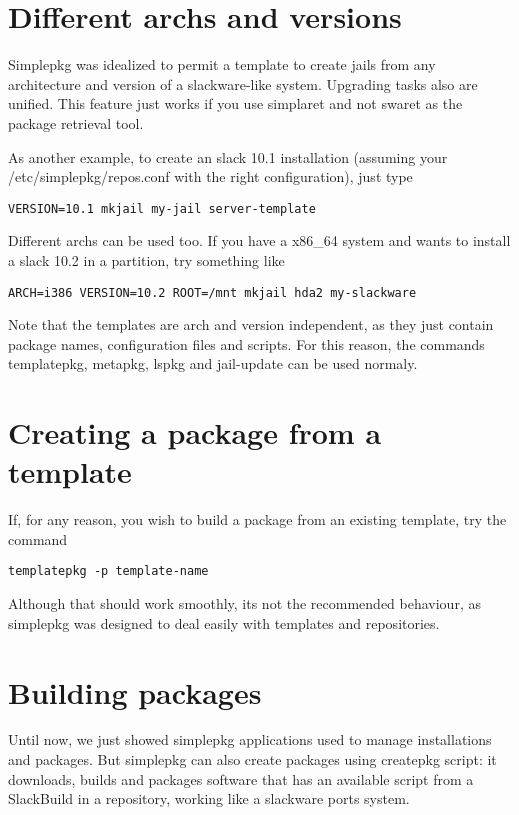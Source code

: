 \documentclass{article}
\begin{document}
\section{Different archs and versions}

Simplepkg was idealized to permit a template to create jails from any architecture and version of a slackware-like system. Upgrading tasks also are unified. This feature just works if you use simplaret and not swaret as the package retrieval tool.

As another example, to create an slack 10.1 installation (assuming your /etc/simplepkg/repos.conf with the right configuration), just type

\begin{verbatim}
VERSION=10.1 mkjail my-jail server-template 
\end{verbatim}

Different archs can be used too. If you have a x86\_64 system and wants to install a slack 10.2 in a partition, try something like

\begin{verbatim}
ARCH=i386 VERSION=10.2 ROOT=/mnt mkjail hda2 my-slackware
\end{verbatim}

Note that the templates are arch and version independent, as they just contain package names, configuration files and scripts. For this reason, the commands templatepkg, metapkg, lspkg and jail-update can be used normaly.

\section{Creating a package from a template}

If, for any reason, you wish to build a package from an existing template, try the command

\begin{verbatim}
templatepkg -p template-name
\end{verbatim}

Although that should work smoothly, its not the recommended behaviour, as simplepkg was designed to deal easily with templates and repositories.

\section{Building packages}

Until now, we just showed simplepkg applications used to manage installations and packages.  But simplepkg can also create packages using createpkg script: it downloads, builds and packages software that has an available script from a SlackBuild in a repository, working like a slackware ports system.
\end{document}

